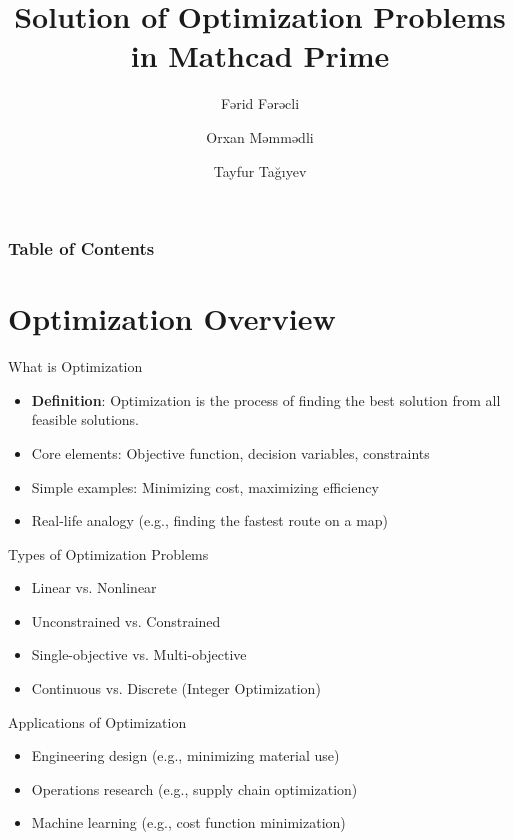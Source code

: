\documentclass{beamer}
\title{\large Solution of Optimization Problems in Mathcad Prime\textsuperscript{\tiny\textregistered}}
\author{Fərid Fərəcli \and Orxan Məmmədli \and Tayfur Tağıyev}
\institute{Azerbaijan State Oil and Industry University}
\begin{document}
\maketitle

\begin{frame}
\frametitle{Table of Contents}
\tableofcontents
\end{frame}

\section{Optimization Overview}

\begin{frame}{What is Optimization}
\begin{itemize}
\item \textbf{Definition}: Optimization is the process of finding the best solution from all feasible solutions.
\vspace{10pt}
\item Core elements: Objective function, decision variables, constraints
\vspace{10pt}
\item Simple examples: Minimizing cost, maximizing efficiency
\vspace{10pt}
\item Real-life analogy (e.g., finding the fastest route on a map)
\end{itemize}
\end{frame}

\begin{frame}{Types of Optimization Problems}
\begin{itemize}
\item Linear vs. Nonlinear
\item Unconstrained vs. Constrained
\item Single-objective vs. Multi-objective
\item Continuous vs. Discrete (Integer Optimization)
\end{itemize}
\end{frame}

\begin{frame}{Applications of Optimization}
\begin{itemize}
\item Engineering design (e.g., minimizing material use)
\item Operations research (e.g., supply chain optimization)
\item Machine learning (e.g., cost function minimization)
\end{itemize}
\end{frame}
\end{document}
